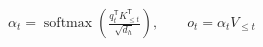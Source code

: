 \documentclass{article}
\begin{document}
\fontsize{10}{12.0}\selectfont
\(\displaystyle \alpha_t=\operatorname{softmax}\!\left(\frac{q_t^{\mathsf T}K_{\leq t}^{\mathsf T}}{\sqrt{d_h}}\right),\qquad o_t=\alpha_t V_{\leq t}\)
\end{document}
